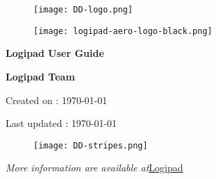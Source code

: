         \begin{titlepage}
            \centering
            \vspace*{0mm} %
            \begin{figure}[!h]
                \vspace*{-20mm}
                \texttt{[image: DD-logo.png]}
            \end{figure}
            \vspace{30mm} %
            \begin{figure}[!h]
                \centering
                \texttt{[image: logipad-aero-logo-black.png]}
            \end{figure}

            \vspace{10mm} 
            \textbf{\Huge {Logipad User Guide}}

            \vspace{30mm}
            \Large \textbf{{Logipad Team}}

            \small Created on : \today

            \vspace*{0mm}
            \small  Last updated : \MonthYearFormat\today
            
            \vspace{50mm}
            \begin{figure}[!h]
                \hspace*{-20mm}
                \texttt{[image: DD-stripes.png]}
            \end{figure}
            \vfill
            \small \textit{More information are available at}{\href{http://www.logipad.aero}{Logipad}}
        \end{titlepage}

        \tableofcontents
        \clearpage

